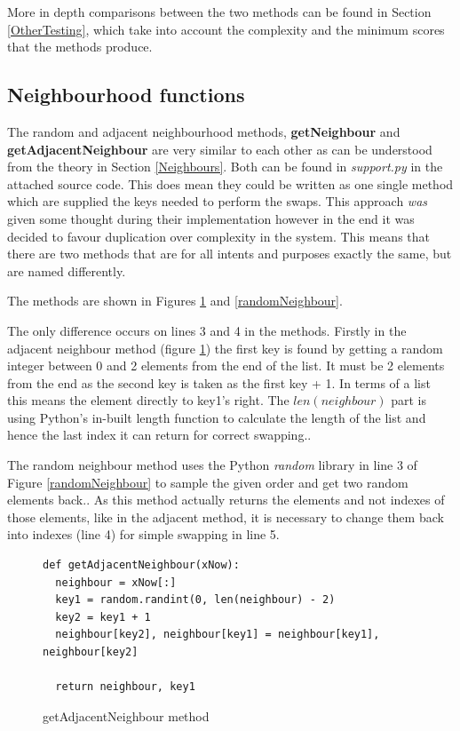 \documentclass[12pt]{report}
\begin{document}
More in depth comparisons between the two methods can be found in Section \ref{OtherTesting}, which take into account the complexity and the minimum scores that the methods produce.

\subsection{Neighbourhood functions}\label{Imp-Neighbours}
The random and adjacent neighbourhood methods, \textbf{getNeighbour} and \textbf{getAdjacentNeighbour} are very similar to each other as can be understood from the theory in Section \ref{Neighbours}. Both can be found in \textit{support.py}  in the attached source code. This does mean they could be written as one single method which are supplied the keys needed to perform the swaps. This approach \textit{was} given some thought during their implementation however in the end it was decided to favour duplication over complexity in the system. This means that there are two methods that are for all intents and purposes exactly the same, but are named differently.

The methods are shown in Figures \ref{adjacentNeighbour} and \ref{randomNeighbour}.

The only difference occurs on lines 3 and 4 in the methods. Firstly in the adjacent neighbour method (figure \ref{adjacentNeighbour}) the first key is found by getting a random integer between 0 and 2 elements from the end of the list. It must be 2 elements from the end as the second key is taken as the first key + 1. In terms of a list this means the element directly to key1's right. The $len(neighbour)$ part is using Python's in-built length function to calculate the length of the list and hence the last index it can return for correct swapping.\cite{PythonLen}.

The random neighbour method uses the Python \textit{random} library in line 3 of Figure \ref{randomNeighbour} to sample the given order and get two random elements back.\cite{PythonSample}. As this method actually returns the elements and not indexes of those elements, like in the adjacent method, it is necessary to change them back into indexes (line 4) for simple swapping in line 5.

\begin{figure}[H]
\caption{getAdjacentNeighbour method}
\label{adjacentNeighbour}
\begin{lstlisting}
def getAdjacentNeighbour(xNow):
  neighbour = xNow[:]
  key1 = random.randint(0, len(neighbour) - 2)
  key2 = key1 + 1
  neighbour[key2], neighbour[key1] = neighbour[key1], neighbour[key2]
    
  return neighbour, key1
\end{lstlisting}
\end{figure}
\end{document}
